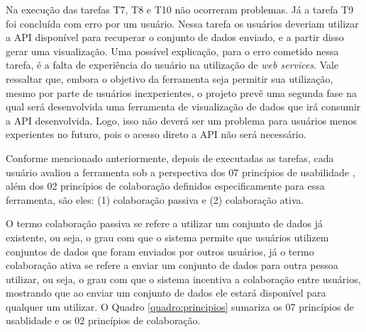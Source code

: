 Na execução das tarefas T7, T8 e T10 não ocorreram problemas. Já a tarefa T9 foi concluída 
com erro por um usuário. Nessa tarefa os usuários deveriam utilizar a API disponível para 
recuperar o conjunto de dados enviado, e a partir disso gerar uma visualização. Uma possível 
explicação, para o erro cometido nessa tarefa, é a falta de experiência do usuário na 
utilização de \textit{web services}. Vale ressaltar que, embora o objetivo da ferramenta 
seja permitir sua utilização, mesmo por parte de usuários inexperientes, o projeto prevê uma 
segunda fase na qual será desenvolvida uma ferramenta de visualização de dados que irá 
consumir a API desenvolvida. Logo, isso não deverá ser um problema para usuários menos 
experientes no futuro, pois o acesso direto a API não será necessário.

Conforme mencionado anteriormente, depois de executadas as tarefas, cada usuário avaliou a 
ferramenta sob a perspectiva dos 07 princípios de usabilidade \cite{nielsen1994usability}, 
além dos 02 princípios de colaboração definidos especificamente para essa ferramenta, são 
eles: (1) colaboração passiva e (2) colaboração ativa.

O termo colaboração passiva se refere a utilizar um conjunto de dados já existente, ou 
seja, o grau com que o sistema permite que usuários utilizem conjuntos de dados que foram 
enviados por outros usuários, já o termo colaboração ativa se refere a enviar um conjunto 
de dados para outra pessoa utilizar, ou seja, o grau com que o sistema incentiva a 
colaboração entre usuários, mostrando que ao enviar um conjunto de dados ele estará 
disponível para qualquer um utilizar. O Quadro \ref{quadro:principios} sumariza os 07 princípios
de usablidade e os 02 princípios de colaboração.

